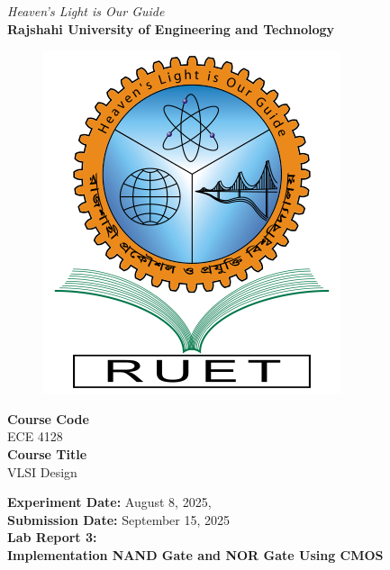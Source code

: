 \vspace*{\fill}
\begin{center}

    \emph{Heaven's Light is Our Guide} \\
    \textbf{Rajshahi University of Engineering and Technology} \\

    \begin{figure}[H]
        \centering
        \includegraphics[scale=.34]{images/RUET_logo.png}
        \label{fig:ruet_logo}
    \end{figure}
    \vspace{5mm}

    \textbf{Course Code}\\
    ECE 4128\\
    \vspace{3mm}
    \textbf{Course Title}\\
    VLSI Design

    \vspace{5mm}
    \textbf{Experiment Date:} {August 8, 2025},\\
    \textbf{Submission Date:} {September 15, 2025}\\

    \vspace{5mm}
    \textbf{Lab Report 3: \\
        Implementation NAND Gate and NOR Gate Using CMOS}

    \vspace{15mm}


\end{center}
